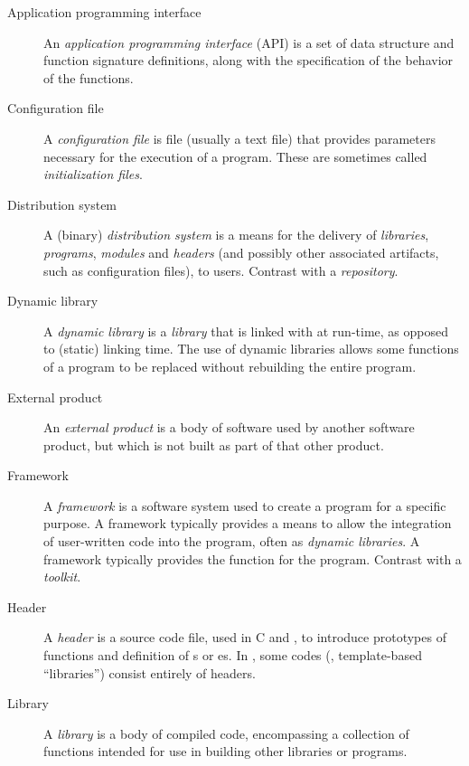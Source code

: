 \documentclass[draftmode,draftwater]{memarticle}
\begin{document}
\begin{description}

\item[Application programming interface] An \emph{application
    programming interface} (API) is a set of data structure and function
  signature definitions, along with the specification of the behavior of
  the functions.

\item[Configuration file] A \emph{configuration file} is file (usually
  a text file) that provides parameters necessary for the execution of
  a program. These are sometimes called \emph{initialization files}.

\item[Distribution system] A (binary) \emph{distribution system} is a
  means for the delivery of \emph{libraries}, \emph{programs},
  \emph{modules} and \emph{headers} (and possibly other associated
  artifacts, such as configuration files), to users. Contrast with a
  \emph{repository}.

\item[Dynamic library] A \emph{dynamic library} is a \emph{library} that
  is linked with at run-time, as opposed to (static) linking time. The
  use of dynamic libraries allows some functions of a program to be
  replaced without rebuilding the entire program.

\item[External product] An \emph{external product} is a body of software
  used by another software product, but which is not built as part of
  that other product.

\item[Framework] A \emph{framework} is a software system used to
  create a program for a specific purpose. A framework typically
  provides a means to allow the integration of user-written code into
  the program, often as \emph{dynamic libraries}.
  A framework typically provides the  function
  for the program. Contrast with a \emph{toolkit}.

\item[Header] A \emph{header} is a source code file, used in C and
  \cpp, to introduce prototypes of functions and definition of
  s or es. In \cpp, some codes (\eg,
  template-based ``libraries'') consist entirely of headers.

\item[Library] A \emph{library} is a body of compiled code,
  encompassing a collection of functions intended for use in building
  other libraries or programs.


\end{description}
\end{document}
